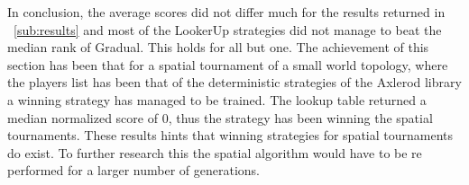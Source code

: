 In conclusion, the average scores did not differ much for the results returned
in ~\autoref{sub:results} and most of the LookerUp strategies did not manage to
beat the median rank of Gradual. This holds for all but one. The achievement
of this section has been that for a spatial tournament of a small world topology,
where the players list has been that of the deterministic strategies of the
Axlerod library a winning strategy has managed to be trained. The lookup table returned
a median normalized score of 0, thus the strategy has been winning the spatial tournaments.
These results hints that winning strategies for spatial tournaments do exist.
To further research this the spatial algorithm would have to be re performed
for a larger number of generations.
